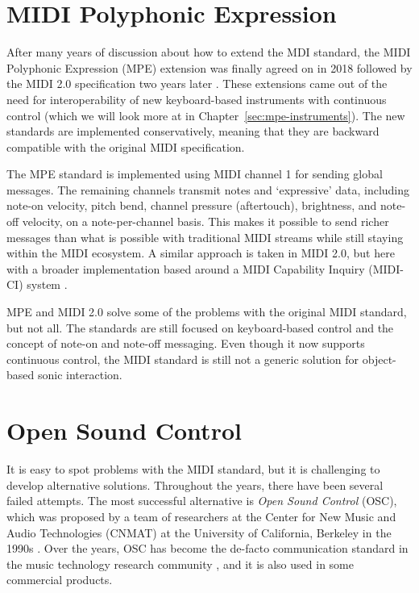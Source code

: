 \section{MIDI Polyphonic Expression}\label{sec:mpe}

After many years of discussion about how to extend the MDI standard, the MIDI Polyphonic Expression (MPE) extension was finally agreed on in 2018 \citep{the_midi_association_midi_2018} followed by the MIDI 2.0 specification two years later \citep{the_midi_association_midi_2000}. These extensions came out of the need for interoperability of new keyboard-based instruments with continuous control (which we will look more at in Chapter~\ref{sec:mpe-instruments}). The new standards are implemented conservatively, meaning that they are backward compatible with the original MIDI specification.

The MPE standard is implemented using MIDI channel 1 for sending global messages. The remaining channels transmit notes and `expressive' data, including note-on velocity, pitch bend, channel pressure (aftertouch), brightness, and note-off velocity, on a note-per-channel basis. This makes it possible to send richer messages than what is possible with traditional MIDI streams while still staying within the MIDI ecosystem. A similar approach is taken in MIDI 2.0, but here with a broader implementation based around a MIDI Capability Inquiry (MIDI-CI) system \citep{the_midi_association_common_2020}.

MPE and MIDI 2.0 solve some of the problems with the original MIDI standard, but not all. The standards are still focused on keyboard-based control and the concept of note-on and note-off messaging. Even though it now supports continuous control, the MIDI standard is still not a generic solution for object-based sonic interaction.


\section{Open Sound Control}

It is easy to spot problems with the MIDI standard, but it is challenging to develop alternative solutions. Throughout the years, there have been several failed attempts. The most successful alternative is \emph{Open Sound Control} (OSC), which was proposed by a team of researchers at the Center for New Music and Audio Technologies (CNMAT) at the University of California, Berkeley in the 1990s \citep{wright_open_1997}. Over the years, OSC has become the de-facto communication standard in the music technology research community \citep{jensenius_open_2017}, and it is also used in some commercial products.


